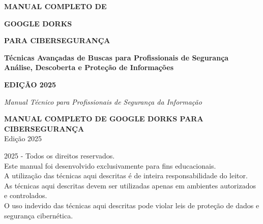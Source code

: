 \documentclass[12pt,a4paper]{book}
\begin{document}
\begin{titlepage}
\centering
\vspace*{2cm}
{\Huge\bfseries\color{azulseguranca} MANUAL COMPLETO DE\par}
\vspace{1cm}
{\Huge\bfseries\color{vermelhoperigo} GOOGLE DORKS \par}
\vspace{0.5cm}
{\huge\bfseries\color{azulseguranca} PARA CIBERSEGURANÇA \par}
\vspace{2cm}
\begin{figure}[H]
\centering
{}
\end{figure}
\vspace{1.5cm}
{\Large\bfseries Técnicas Avançadas de Buscas para Profissionais de Segurança\\[0.5cm]}
{\large\bfseries\textcolor{azulseguranca}{Análise, Descoberta e Proteção de Informações}\\[2cm]}

{\large\bfseries\textcolor{pretodiscreto}{EDIÇÃO 2025}}

\vfill
{\large \textit{Manual Técnico para Profissionais de Segurança da Informação}}
\end{titlepage}

\newpage
\thispagestyle{empty}
\vspace*{5cm}
\begin{center}
{\Large\bfseries\color{azulseguranca} MANUAL COMPLETO DE GOOGLE DORKS PARA CIBERSEGURANÇA}\\[1cm]
{\large Edição 2025}\\[2cm]

\vfill

{\small\textcopyright{} 2025 - Todos os direitos reservados.}\\[0.3cm]
{\small Este manual foi desenvolvido exclusivamente para fins educacionais.}\\[0.3cm]
{\small A utilização das técnicas aqui descritas é de inteira responsabilidade do leitor.}\\[0.3cm]
{\small As técnicas aqui descritas devem ser utilizadas apenas em ambientes autorizados e controlados.}\\[0.3cm]
{\small O uso indevido das técnicas aqui descritas pode violar leis de proteção de dados e segurança cibernética.}
\end{center}
\end{document}
